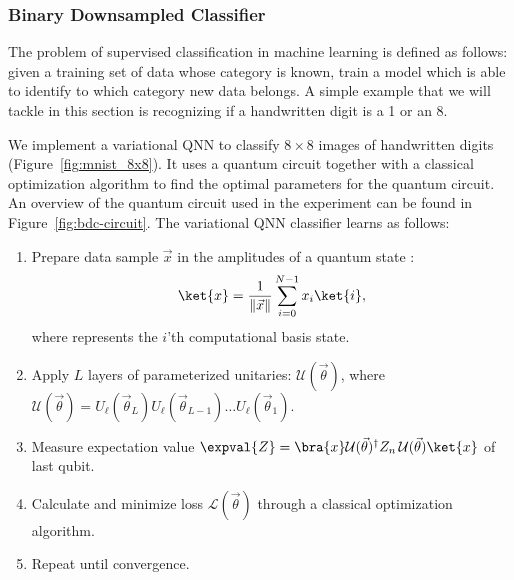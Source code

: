 \documentclass[a4paper,10pt]{article}
\begin{document}
\subsubsection{Binary Downsampled Classifier} \label{sec:bdc}
The problem of supervised classification in machine learning is defined as follows: given a training set of data whose category is known, train a model which is able to identify to which category new data belongs.
A simple example that we will tackle in this section is recognizing if a handwritten digit is a 1 or an 8.

We implement a variational QNN to classify $8 \times 8$ images of handwritten digits (Figure~\ref{fig:mnist_8x8}).
It uses a quantum circuit together with a classical optimization algorithm to find the optimal parameters for the quantum circuit.
An overview of the quantum circuit used in the experiment can be found in Figure~\ref{fig:bdc-circuit}.
The variational QNN classifier learns as follows:
\begin{enumerate}
	\item Prepare data sample $\vec{x}$ in the amplitudes of a quantum state :
	\begin{equation}
	 \ket{x} = \dfrac{1}{\lVert\vec{x}\rVert}\sum_{i=0}^{N-1} x_i\ket{i},
	\end{equation}
	where  represents the $i$'th computational basis state.
	\item Apply $L$ layers of parameterized unitaries: $\mathcal{U}(\vec{\theta})$, where $\mathcal{U}(\vec{\theta}) = U_\ell(\vec{\theta}_L) U_\ell(\vec{\theta}_{L-1}) \ldots U_\ell(\vec{\theta}_1)$.
	\item Measure expectation value $\expval{Z} = \bra{x}\mathcal{U}(\vec{\theta})^\dagger Z_n\, \mathcal{U}(\vec{\theta})\ket{x}$ of last qubit.
	\item Calculate and minimize loss $\mathcal{L}(\vec{\theta})$ through a classical optimization algorithm.
	\item Repeat until convergence.
\end{enumerate}
\end{document}
